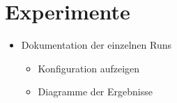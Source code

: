 \section{Experimente}\label{sec:experimente}

\begin{itemize}
    \item Dokumentation der einzelnen Runs
    \begin{itemize}
        \item Konfiguration aufzeigen
        \item Diagramme der Ergebnisse
    \end{itemize}
\end{itemize}